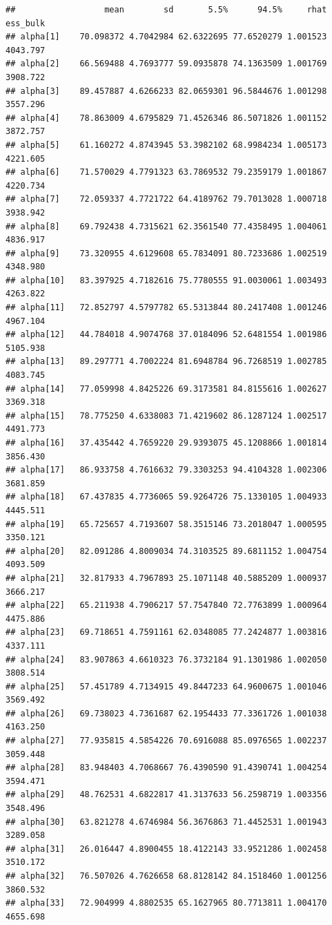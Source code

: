 \documentclass[
]{book}
\begin{document}
\begin{verbatim}
##                  mean        sd       5.5%      94.5%     rhat ess_bulk
## alpha[1]    70.098372 4.7042984 62.6322695 77.6520279 1.001523 4043.797
## alpha[2]    66.569488 4.7693777 59.0935878 74.1363509 1.001769 3908.722
## alpha[3]    89.457887 4.6266233 82.0659301 96.5844676 1.001298 3557.296
## alpha[4]    78.863009 4.6795829 71.4526346 86.5071826 1.001152 3872.757
## alpha[5]    61.160272 4.8743945 53.3982102 68.9984234 1.005173 4221.605
## alpha[6]    71.570029 4.7791323 63.7869532 79.2359179 1.001867 4220.734
## alpha[7]    72.059337 4.7721722 64.4189762 79.7013028 1.000718 3938.942
## alpha[8]    69.792438 4.7315621 62.3561540 77.4358495 1.004061 4836.917
## alpha[9]    73.320955 4.6129608 65.7834091 80.7233686 1.002519 4348.980
## alpha[10]   83.397925 4.7182616 75.7780555 91.0030061 1.003493 4263.822
## alpha[11]   72.852797 4.5797782 65.5313844 80.2417408 1.001246 4967.104
## alpha[12]   44.784018 4.9074768 37.0184096 52.6481554 1.001986 5105.938
## alpha[13]   89.297771 4.7002224 81.6948784 96.7268519 1.002785 4083.745
## alpha[14]   77.059998 4.8425226 69.3173581 84.8155616 1.002627 3369.318
## alpha[15]   78.775250 4.6338083 71.4219602 86.1287124 1.002517 4491.773
## alpha[16]   37.435442 4.7659220 29.9393075 45.1208866 1.001814 3856.430
## alpha[17]   86.933758 4.7616632 79.3303253 94.4104328 1.002306 3681.859
## alpha[18]   67.437835 4.7736065 59.9264726 75.1330105 1.004933 4445.511
## alpha[19]   65.725657 4.7193607 58.3515146 73.2018047 1.000595 3350.121
## alpha[20]   82.091286 4.8009034 74.3103525 89.6811152 1.004754 4093.509
## alpha[21]   32.817933 4.7967893 25.1071148 40.5885209 1.000937 3666.217
## alpha[22]   65.211938 4.7906217 57.7547840 72.7763899 1.000964 4475.886
## alpha[23]   69.718651 4.7591161 62.0348085 77.2424877 1.003816 4337.111
## alpha[24]   83.907863 4.6610323 76.3732184 91.1301986 1.002050 3808.514
## alpha[25]   57.451789 4.7134915 49.8447233 64.9600675 1.001046 3569.492
## alpha[26]   69.738023 4.7361687 62.1954433 77.3361726 1.001038 4163.250
## alpha[27]   77.935815 4.5854226 70.6916088 85.0976565 1.002237 3059.448
## alpha[28]   83.948403 4.7068667 76.4390590 91.4390741 1.004254 3594.471
## alpha[29]   48.762531 4.6822817 41.3137633 56.2598719 1.003356 3548.496
## alpha[30]   63.821278 4.6746984 56.3676863 71.4452531 1.001943 3289.058
## alpha[31]   26.016447 4.8900455 18.4122143 33.9521286 1.002458 3510.172
## alpha[32]   76.507026 4.7626658 68.8128142 84.1518460 1.001256 3860.532
## alpha[33]   72.904999 4.8802535 65.1627965 80.7713811 1.004170 4655.698

\end{verbatim}
\end{document}
